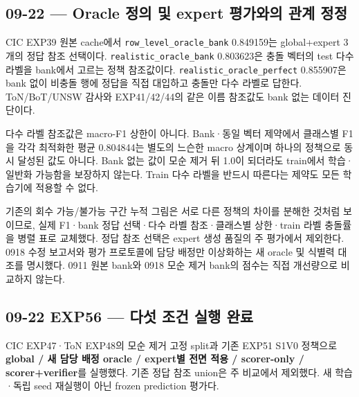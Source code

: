 \subsection{09-22 — Oracle 정의 및 expert 평가와의 관계 정정}
CIC EXP39 원본 cache에서 \texttt{row\_\allowbreak{}\allowbreak{}leve\allowbreak{}l\_\allowbreak{}\allowbreak{}oracle\allowbreak{}\_\allowbreak{}\allowbreak{}bank} 0.849159는 global+\allowbreak{}expert 3개의 정답 참조 선택이다. \texttt{realisti\allowbreak{}c\_\allowbreak{}\allowbreak{}oracle\allowbreak{}\_\allowbreak{}\allowbreak{}bank} 0.803623은 충돌 벡터의 test 다수 라벨을 bank에서 고르는 정책 참조값이다. \texttt{realisti\allowbreak{}c\_\allowbreak{}\allowbreak{}oracle\allowbreak{}\_\allowbreak{}\allowbreak{}perfect\allowbreak{}} 0.855907은 bank 없이 비충돌 행에 정답을 직접 대입하고 충돌만 다수 라벨로 답한다. ToN/\allowbreak{}BoT/\allowbreak{}UNSW 감사와 EXP41/\allowbreak{}42/\allowbreak{}44의 같은 이름 참조값도 bank 없는 데이터 진단이다.

다수 라벨 참조값은 macro-F1 상한이 아니다. Bank·동일 벡터 제약에서 클래스별 F1을 각각 최적화한 평균 0.804844는 별도의 느슨한 macro 상계이며 하나의 정책으로 동시 달성된 값도 아니다. Bank 없는 값이 모순 제거 뒤 1.0이 되더라도 train에서 학습·일반화 가능함을 보장하지 않는다. Train 다수 라벨을 반드시 따른다는 제약도 모든 학습기에 적용할 수 없다.

기존의 회수 가능/\allowbreak{}불가능 구간 누적 그림은 서로 다른 정책의 차이를 분해한 것처럼 보이므로, 실제 F1·bank 정답 선택·다수 라벨 참조·클래스별 상한·train 라벨 충돌률을 병렬 표로 교체했다. 정답 참조 선택은 expert 생성 품질의 주 평가에서 제외한다. 0918 수정 보고서와 평가 프로토콜에 담당 배정만 이상화하는 새 oracle 및 식별력 대조를 명시했다. 0911 원본 bank와 0918 모순 제거 bank의 점수는 직접 개선량으로 비교하지 않는다.

\subsection{09-22 EXP56 — 다섯 조건 실행 완료}
CIC EXP47·ToN EXP48의 모순 제거 고정 split과 기존 EXP51 S1V0 정책으로 \textbf{global /\allowbreak{} 새 담당 배정 oracle /\allowbreak{} expert별 전면 적용 /\allowbreak{} scorer-only /\allowbreak{} scorer+\allowbreak{}verifier}를 실행했다. 기존 정답 참조 union은 주 비교에서 제외했다. 새 학습·독립 seed 재실행이 아닌 frozen prediction 평가다.

